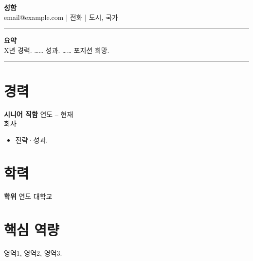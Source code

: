 \documentclass[11pt,a4paper]{article}
\begin{document}
\begin{center}
{\LARGE \textbf{성함}}\\[0.2em]
email@example.com \quad | \quad 전화 \quad | \quad 도시, 국가
\end{center}
\begin{flushright}\rule{2cm}{2.5cm}\end{flushright}
\vspace{0.4em}
\noindent\textbf{요약}\\
X년 경력. …… 성과. …… 포지션 희망.

\vspace{0.5em}
\noindent\rule{\textwidth}{0.4pt}
\section*{경력}
\textbf{시니어 직함} \hfill 연도 -- 현재 \\
회사 \\
\begin{itemize}
  \item 전략·성과.
\end{itemize}
\section*{학력}
\textbf{학위} \hfill 연도 \quad 대학교
\section*{핵심 역량}
영역1, 영역2, 영역3.
\end{document}

